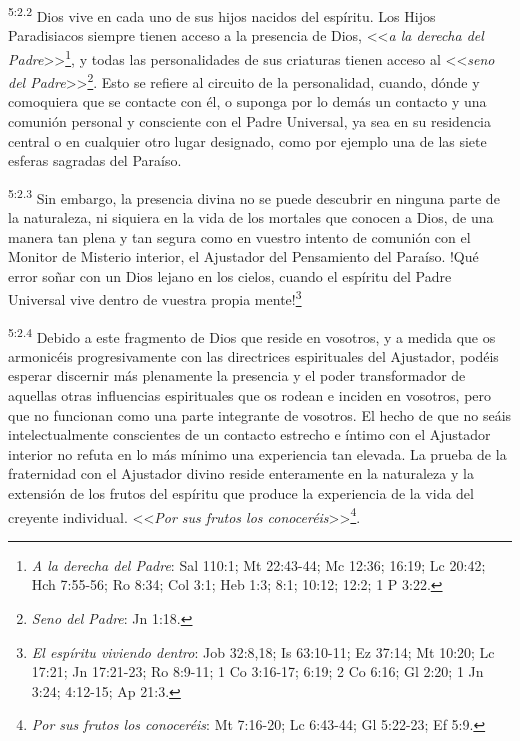 \par
\textsuperscript{5:2.2} Dios vive en cada uno de sus hijos nacidos del espíritu. Los Hijos Paradisiacos siempre tienen acceso a la presencia de Dios, <<\textit{a la derecha del Padre}>>\footnote{\textit{A la derecha del Padre}: Sal 110:1; Mt 22:43-44; Mc 12:36; 16:19; Lc 20:42; Hch 7:55-56; Ro 8:34; Col 3:1; Heb 1:3; 8:1; 10:12; 12:2; 1 P 3:22.}, y todas las personalidades de sus criaturas tienen acceso al <<\textit{seno del Padre}>>\footnote{\textit{Seno del Padre}: Jn 1:18.}. Esto se refiere al circuito de la personalidad, cuando, dónde y comoquiera que se contacte con él, o suponga por lo demás un contacto y una comunión personal y consciente con el Padre Universal, ya sea en su residencia central o en cualquier otro lugar designado, como por ejemplo una de las siete esferas sagradas del Paraíso.

\par
\textsuperscript{5:2.3} Sin embargo, la presencia divina no se puede descubrir en ninguna parte de la naturaleza, ni siquiera en la vida de los mortales que conocen a Dios, de una manera tan plena y tan segura como en vuestro intento de comunión con el Monitor de Misterio interior, el Ajustador del Pensamiento del Paraíso. !Qué error soñar con un Dios lejano en los cielos, cuando el espíritu del Padre Universal vive dentro de vuestra propia mente!\footnote{\textit{El espíritu viviendo dentro}: Job 32:8,18; Is 63:10-11; Ez 37:14; Mt 10:20; Lc 17:21; Jn 17:21-23; Ro 8:9-11; 1 Co 3:16-17; 6:19; 2 Co 6:16; Gl 2:20; 1 Jn 3:24; 4:12-15; Ap 21:3.}

\par
\textsuperscript{5:2.4} Debido a este fragmento de Dios que reside en vosotros, y a medida que os armonicéis progresivamente con las directrices espirituales del Ajustador, podéis esperar discernir más plenamente la presencia y el poder transformador de aquellas otras influencias espirituales que os rodean e inciden en vosotros, pero que no funcionan como una parte integrante de vosotros. El hecho de que no seáis intelectualmente conscientes de un contacto estrecho e íntimo con el Ajustador interior no refuta en lo más mínimo una experiencia tan elevada. La prueba de la fraternidad con el Ajustador divino reside enteramente en la naturaleza y la extensión de los frutos del espíritu que produce la experiencia de la vida del creyente individual. <<\textit{Por sus frutos los conoceréis}>>\footnote{\textit{Por sus frutos los conoceréis}: Mt 7:16-20; Lc 6:43-44; Gl 5:22-23; Ef 5:9.}.

